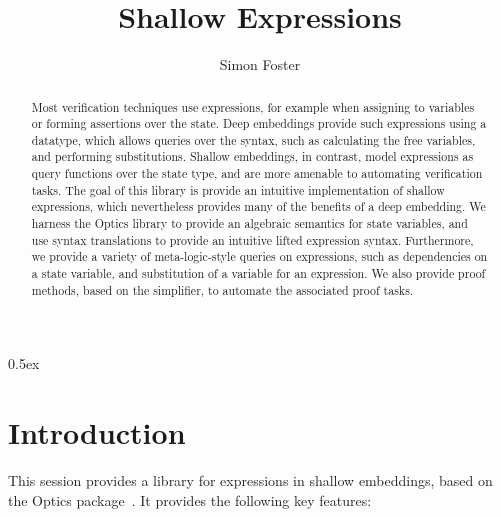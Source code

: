 \documentclass[11pt,a4paper]{article}
\begin{document}
\title{Shallow Expressions}
\author{Simon Foster}
\maketitle

\begin{abstract}
\noindent Most verification techniques use expressions, for example when assigning to variables or 
forming assertions over the state. Deep embeddings provide such expressions using a datatype, which 
allows queries over the syntax, such as calculating the free variables, and performing substitutions. 
Shallow embeddings, in contrast, model expressions as query functions over the state type, and are 
more amenable to automating verification tasks. The goal of this library is provide an intuitive 
implementation of shallow expressions, which nevertheless provides many of the benefits of a deep 
embedding. We harness the Optics library to provide an algebraic semantics for state variables,
and use syntax translations to provide an intuitive lifted expression syntax. Furthermore, we
provide a variety of meta-logic-style queries on expressions, such as dependencies
on a state variable, and substitution of a variable for an expression. We also provide proof 
methods, based on the simplifier, to automate the associated proof tasks.
\end{abstract}

\tableofcontents

\parindent 0pt\parskip 0.5ex

\section{Introduction}

This session provides a library for expressions in shallow embeddings, based on the Optics
package~\cite{Optics-AFP}. It provides the following key features:
\end{document}
